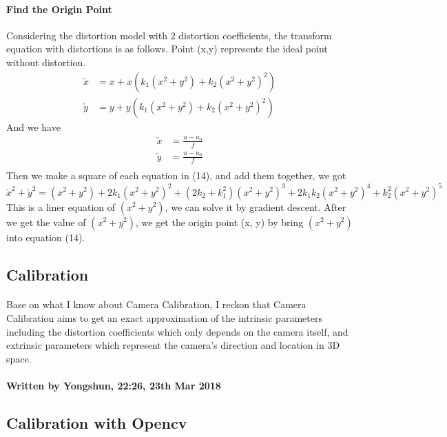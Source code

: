 \documentclass{article}
\begin{document}
\paragraph{Find the Origin Point} Considering the distortion model with 2 distortion coefficients, the transform equation with distortions is as follows. Point (x,y) represents the ideal point without distortion.
\begin{equation}
\begin{align}
\check{x} &= x + x(k_1(x^2+y^2)+k_2(x^2+y^2)^2)\\
\check{y} &= y + y(k_1(x^2+y^2)+k_2(x^2+y^2)^2)
\end{align}
\end{equation}
And we have
\begin{equation}
\begin{align}
\check{x} &= \frac{u - u_0}{f}\\
\check{y} &= \frac{u - u_0}{f}\\
\end{align}
\end{equation}
Then we make a square of each equation in (14), and add them together, we got
\begin{equation}
\check{x}^2 + \check{y}^2 = (x^2+y^2) + 2k_1(x^2+y^2)^2+(2k_2+k_1^2)(x^2+y^2)^3+2k_1k_2(x^2+y^2)^4+k_2^2(x^2+y^2)^5
\end{equation}
This is a liner equation of $(x^2+y^2)$, we can solve it by gradient descent. After we get the value of $(x^2+y^2)$, we get the origin point (x, y) by bring $(x^2+y^2)$ into equation (14).
\subsection{Calibration}
\paragraph{}
Base on what I know about Camera Calibration, I reckon that Camera Calibration aims to get an exact approximation of the intrinsic parameters including the distortion coefficients which only depends on the camera itself, and extrinsic parameters which represent the camera's direction and location in 3D space.
\paragraph{Written by Yongshun, 22:26, 23th Mar 2018}

\subsection{Calibration with Opencv}
\end{document}
